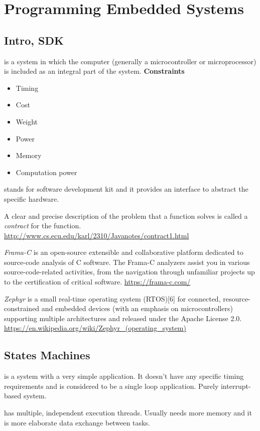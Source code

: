 \chapter{Programming Embedded Systems}

\section{Intro, SDK}
 is a system in which the computer (generally a microcontroller or microprocessor) is included as an integral part of the system.
\textbf{Constraints}
\begin{itemize}
    \item Timing 
    \item Cost 
    \item Weight 
    \item Power 
    \item Memory
    \item Computation power
\end{itemize}

 stands for software development kit and it provides an interface to abstract the specific hardware.

A clear and precise description of the problem that a function solves is called a \textit{contract} for the function.
\url{http://www.cs.ecu.edu/karl/2310/Javanotes/contract1.html}

\textit{Frama-C} is an open-source extensible and collaborative platform dedicated to source-code analysis of C software. The Frama-C analyzers assist you in various source-code-related activities, from the navigation through unfamiliar projects up to the certification of critical software. 
\url{https://frama-c.com/}

\textit{Zephyr} is a small real-time operating system (RTOS)[6] for connected, resource-constrained and embedded devices (with an emphasis on microcontrollers) supporting multiple architectures and released under the Apache License 2.0.
\url{https://en.wikipedia.org/wiki/Zephyr_(operating_system)}


\section{States Machines}
 is a system with a very simple application.
It doesn't have any specific timing requirements and is considered
to be a single loop application. Purely interrupt-based system.

 has multiple, independent execution threads. Usually
needs more memory and it is more elaborate data exchange between tasks.

